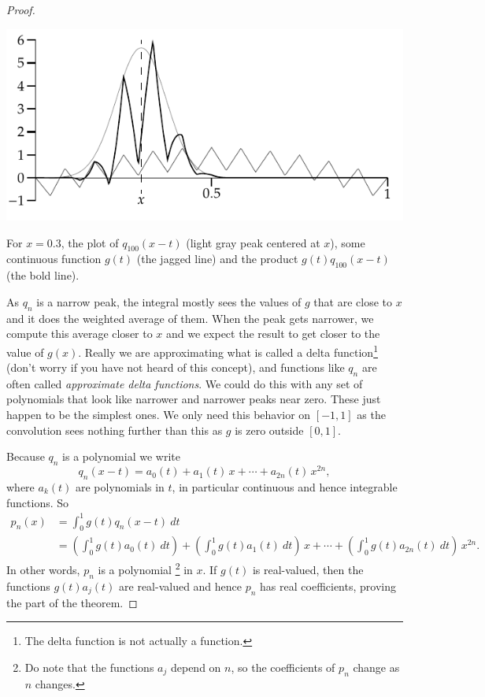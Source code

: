 \begin{proof}
\begin{myfigureht}
\includegraphics{figures/approxdeltaconv}
\caption{For $x=0.3$, the plot of $q_{100}(x-t)$ (light gray peak centered
at $x$), some continuous function
$g(t)$ (the jagged line) and the product $g(t)q_{100}(x-t)$ (the bold line).\label{fig:approxdeltaconv}}
\end{myfigureht}

As $q_n$ is a narrow peak, the integral
mostly sees the values of $g$ that are
close to $x$ and it does the weighted average of them.
When the peak gets narrower, we compute this average closer to $x$
and we expect the result to get closer to the value of $g(x)$.  Really we are
approximating what is called a delta function\footnote{The delta function
is not actually a function.} (don't worry if you have not
heard of this concept),
and functions like $q_n$ are often called
\emph{approximate delta functions}.
We could do this with any set of polynomials that look like narrower
and narrower peaks near zero.  These just happen to be the simplest ones.
We only need this behavior on $[-1,1]$ as the convolution sees nothing
further than this as $g$ is zero outside $[0,1]$.

Because $q_n$ is a polynomial we write
\begin{equation*}
q_n(x-t) = a_0(t) + a_1(t)\,x + \cdots + a_{2n}(t)\, x^{2n} ,
\end{equation*}
where $a_k(t)$ are polynomials in $t$, in particular continuous and hence
integrable functions.
So
\begin{equation*}
\begin{split}
p_n(x) & =
\int_{0}^1 g(t)q_n(x-t) ~dt
\\
&=
\left(
\int_0^1
g(t)
a_0(t)~dt
\right)
+
\left(
\int_0^1
g(t)
a_1(t)~dt
\right)
\,
x
+
\cdots
+
\left(
\int_0^1
g(t)
a_{2n}(t)~dt
\right)
\,
x^{2n} .
\end{split}
\end{equation*}
In other words, $p_n$ is a polynomial%
\footnote{%
Do note that the functions $a_j$ depend on $n$, so the coefficients of $p_n$
change as $n$ changes.}
 in $x$.
If $g(t)$ is real-valued, then the functions $g(t)a_j(t)$ are
real-valued and hence $p_n$ has real coefficients,
proving the  part of the theorem.


\end{proof}

